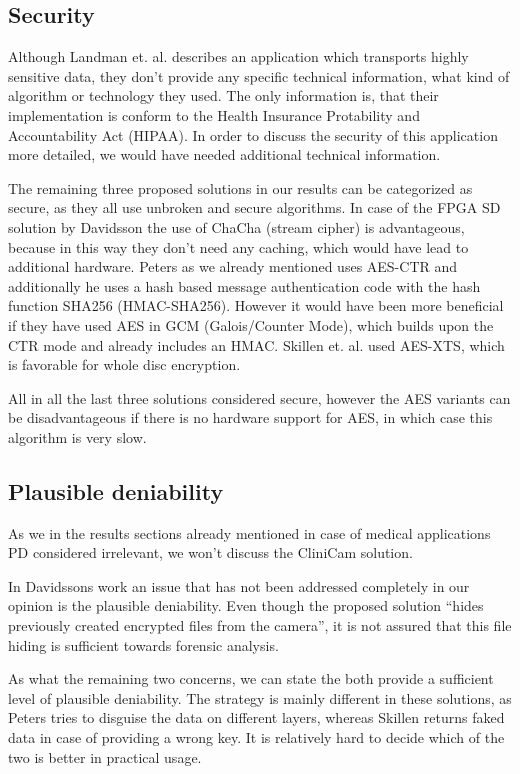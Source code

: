 \documentclass[12pt,a4paper,titlepage,oneside]{scrartcl}
\begin{document}
\subsection{Security}
Although Landman et. al. describes an application which transports highly sensitive data, they don't provide any specific technical information, what kind of algorithm or technology they used.
The only information is, that their implementation is conform to the Health Insurance Protability and Accountability Act (HIPAA).
In order to discuss the security of this application more detailed, we would have needed additional technical information.

The remaining three proposed solutions in our results can be categorized as secure, as they all use unbroken and secure algorithms.
In case of the FPGA SD solution by Davidsson the use of ChaCha (stream cipher) is advantageous, because in this way they don't need any caching, which would have lead to additional hardware.
Peters as we already mentioned uses AES-CTR and additionally he uses a hash based message authentication code with the hash function SHA256 (HMAC-SHA256).
However it would have been more beneficial if they have used AES in GCM (Galois/Counter Mode), which builds upon the CTR mode and already includes an HMAC. \cite{mcgrew2004security}
Skillen et. al. used AES-XTS, which is favorable for whole disc encryption.

All in all the last three solutions considered secure, however the AES variants can be disadvantageous if there is no hardware support for AES, in which case this algorithm is very slow.

\subsection{Plausible deniability}
As we in the results sections already mentioned in case of medical applications PD considered irrelevant, we won't discuss the CliniCam solution.

In Davidssons work an issue that has not been addressed completely in our opinion is the plausible deniability.
Even though the proposed solution ``hides previously created encrypted files from the camera'', it is not assured that this file hiding is sufficient towards forensic analysis.

As what the remaining two concerns, we can state the both provide a sufficient level of plausible deniability.
The strategy is mainly different in these solutions, as Peters tries to disguise the data on different layers, whereas Skillen returns faked data in case of providing a wrong key.
It is relatively hard to decide which of the two is better in practical usage.
\end{document}
